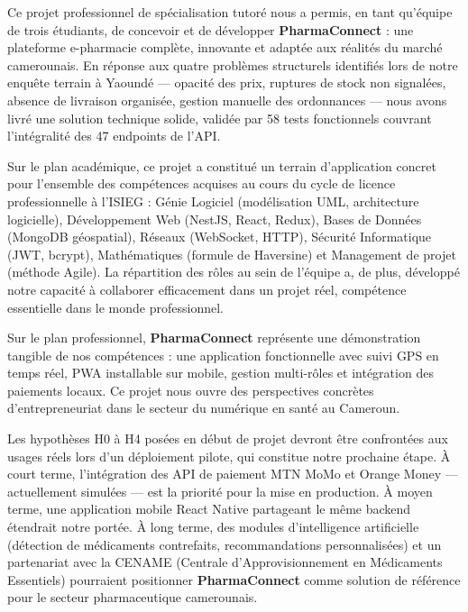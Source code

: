 \documentclass[12pt,a4paper,oneside]{report}
\newcommand{\pharma}{\textcolor{vertpharma}{\textbf{PharmaConnect}}}
\begin{document}
Ce projet professionnel de spécialisation tutoré nous a permis, en tant qu'équipe de trois étudiants, de concevoir et de développer \textbf{PharmaConnect} : une plateforme e-pharmacie complète, innovante et adaptée aux réalités du marché camerounais. En réponse aux quatre problèmes structurels identifiés lors de notre enquête terrain à Yaoundé — opacité des prix, ruptures de stock non signalées, absence de livraison organisée, gestion manuelle des ordonnances — nous avons livré une solution technique solide, validée par 58 tests fonctionnels couvrant l'intégralité des 47 endpoints de l'API.

Sur le plan académique, ce projet a constitué un terrain d'application concret pour l'ensemble des compétences acquises au cours du cycle de licence professionnelle à l'ISIEG : Génie Logiciel (modélisation UML, architecture logicielle), Développement Web (NestJS, React, Redux), Bases de Données (MongoDB géospatial), Réseaux (WebSocket, HTTP), Sécurité Informatique (JWT, bcrypt), Mathématiques (formule de Haversine) et Management de projet (méthode Agile). La répartition des rôles au sein de l'équipe a, de plus, développé notre capacité à collaborer efficacement dans un projet réel, compétence essentielle dans le monde professionnel.

Sur le plan professionnel, \pharma{} représente une démonstration tangible de nos compétences : une application fonctionnelle avec suivi GPS en temps réel, PWA installable sur mobile, gestion multi-rôles et intégration des paiements locaux. Ce projet nous ouvre des perspectives concrètes d'entrepreneuriat dans le secteur du numérique en santé au Cameroun.

Les hypothèses H0 à H4 posées en début de projet devront être confrontées aux usages réels lors d'un déploiement pilote, qui constitue notre prochaine étape. À court terme, l'intégration des API de paiement MTN MoMo et Orange Money — actuellement simulées — est la priorité pour la mise en production. À moyen terme, une application mobile React Native partageant le même backend étendrait notre portée. À long terme, des modules d'intelligence artificielle (détection de médicaments contrefaits, recommandations personnalisées) et un partenariat avec la CENAME (Centrale d'Approvisionnement en Médicaments Essentiels) pourraient positionner \pharma{} comme solution de référence pour le secteur pharmaceutique camerounais.

\clearpage

\appendix
\end{document}
